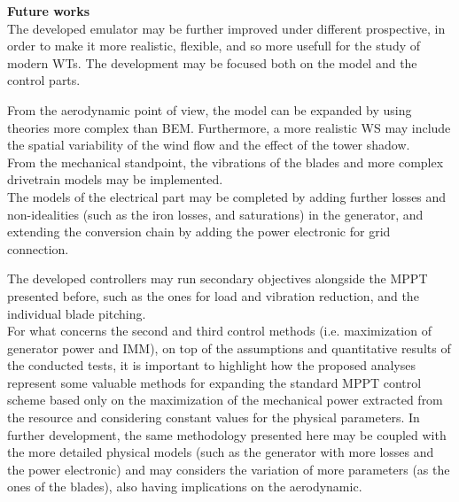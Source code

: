 \textbf{Future works}\\
The developed emulator may be further improved under different prospective, in order to make it more realistic, flexible, and so more usefull for the study of modern WTs. The development may be focused both on the model and the control parts.

From the aerodynamic point of view, the model can be expanded by using theories more complex than BEM. Furthermore, a more realistic WS may include the spatial variability of the wind flow and the effect of the tower shadow.\\
From the mechanical standpoint, the vibrations of the blades and more complex drivetrain models may be implemented.\\
The models of the electrical part may be completed by adding further losses and non-idealities (such as the iron losses, and saturations) in the generator, and extending the conversion chain by adding the power electronic for grid connection. 

The developed controllers may run secondary objectives alongside the MPPT presented before, such as the ones for load and vibration reduction, and the individual blade pitching. \\
For what concerns the second and third control methods (i.e. maximization of generator power and IMM), on top of the assumptions and quantitative results of the conducted tests, it is important to highlight how the proposed analyses represent some valuable methods for expanding the standard MPPT control scheme based only on the maximization of the mechanical power extracted from the resource and considering constant values for the physical parameters. In further development, the same methodology presented here may be coupled with the more detailed physical models (such as the generator with more losses and the power electronic) and may considers the variation of more parameters (as the ones of the blades), also having implications on the aerodynamic. 